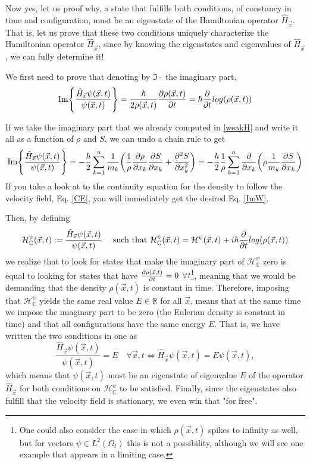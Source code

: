 \documentclass[11pt, a4paper]{article} %
\newcommand{\R}{\mathbb{R}} %
\newcommand{\C}{\mathbb{C}}
\newcommand{\h}{\mathcal{H}}
\DeclareRobustCommand{\mybox}[2][gray!10]{%
\begin{tcolorbox}[   %
        left=0.2cm,
        right=0.2cm,
        top=0.15cm,
        bottom=0.15cm,
        colback=#1,
        colframe=#1,
        width=\dimexpr\textwidth\relax, 
        enlarge left by=0mm,
        boxsep=5pt,
        arc=0pt,outer arc=0pt,
        ]
        #2
\end{tcolorbox}
}
\begin{document}
Now yes, let us proof why, a state that fulfills both conditions, of constancy in time and configuration, must be an eigenstate of the Hamiltonian operator $\hat{H}_{\vec{x}}$. That is, let us prove that these two conditions uniquely characterize the Hamiltonian operator $\hat{H}_{\vec{x}}$, since by knowing the eigenstates and eigenvalues of $\hat{H}_{\vec{x}}$, we can fully determine it!

We first need to prove that denoting by $\Im{\cdot}$ the imaginary part,
\begin{equation}\label{ImH}
\Im{\frac{\hat{H}_{\vec{x}}\psi(\vec{x},t)}{\psi(\vec{x},t)}}=\frac{\hbar}{2\rho(\vec{x},t)}\pdv{\rho(\vec{x},t)}{t}=\hbar\pdv{}{t}log(\rho(\vec{x},t))
\end{equation}
\mybox{
If we take the imaginary part that we already computed in \eqref{weakH} and write it all as a function of $\rho$ and $S$, we can undo a chain rule to get
\begin{equation}
\Im{\frac{\hat{H}_{\vec{x}}\psi(\vec{x},t)}{\psi(\vec{x},t)}}=-\frac{\hbar}{2} \sum_{k=1}^n\frac{1}{m_k}\qty(\frac{1}{\rho}\pdv{\rho}{x_k}\pdv{S}{x_k}+\pdv[2]{S}{x_k})=-\frac{\hbar}{2}\frac{1}{\rho}\sum_{k=1}^n\pdv{}{x_k}\qty(\rho\frac{1}{m_k}\pdv{S}{x_k})
\end{equation}
If you take a look at to the continuity equation for the density to follow the velocity field, Eq. \eqref{CE}, you will immediately get the desired Eq. \eqref{ImW}.
}
Then, by defining 
\begin{equation}
\h_\C^\psi(\vec{x},t):=\frac{\hat{H}_{\vec{x}}\psi(\vec{x},t)}{\psi(\vec{x},t)}\quad \text{ such that  }\h_\C^\psi(\vec{x},t)=\h^\psi(\vec{x},t)+i\hbar\pdv{}{t}log(\rho(\vec{x},t))
\end{equation}
we realize that to look for states that make the imaginary part of $\h^\psi_\C$ zero is equal to looking for states that have $\pdv{\rho(\vec{x},t)}{t}=0$ $\forall t$\footnote{One could also consider the case in which $\rho(\vec{x},t)$ spikes to infinity as well, but for vectors $\psi\in L^2(\Omega_t)$ this is not a possibility, although we will see one example that appears in a limiting case.}, meaning that we would be demanding that the density $\rho(\vec{x},t)$ is constant in time. Therefore, imposing that $\h^\psi_\C$ yields the same real value $E\in\R$ for all $\vec{x}$, means that at the same time we impose the imaginary part to be zero (the Eulerian density is constant in time) and that all configurations have the same energy $E$. That is, we have written the two conditions in one as
\begin{equation}
\frac{\hat{H}_{\vec{x}}\psi(\vec{x},t)}{\psi(\vec{x},t)}=E\quad \forall \vec{x},t\Longleftrightarrow \hat{H}_{\vec{x}}\psi(\vec{x},t)=E\psi(\vec{x},t),
\end{equation}
which means that $\psi(\vec{x},t)$ must be an eigenstate of eigenvalue $E$ of the operator $\hat{H}_{\vec{x}}$ for both conditions on $\h^\psi_\C$ to be satisfied. Finally, since the eigenstates also fulfill that the velocity field is stationary, we even win that "for free".
\end{document}
